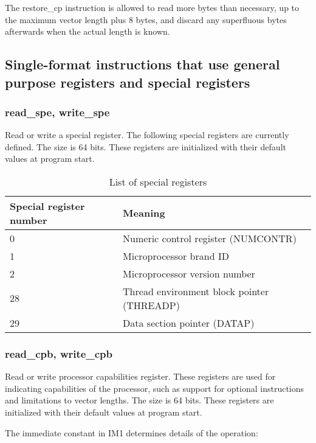 \documentclass[forwardcom.tex]{subfiles}
\begin{document}
The restore\_cp instruction is allowed to read more bytes than necessary, up to the maximum vector length plus 8 bytes, and discard any superfluous bytes afterwards when the actual length is known.

\subsection{Single-format instructions that use general purpose registers and special registers}

\subsubsection{read\_spe, write\_spe}
Read or write a special register. The following special registers are currently defined. The size is 64 bits. These registers are initialized with their default values at program start.

\begin{longtable} {|p{15mm}|p{100mm}|}
\caption{List of special registers} 
\label{table:specialRegisters} \\
\endfirsthead
\endhead
\hline
\bfseries Special register number & \bfseries Meaning  \\
\hline
0 & Numeric control register (NUMCONTR)  \\
1 & Microprocessor brand ID  \\
2 & Microprocessor version number   \\
28 & Thread environment block pointer (THREADP)   \\
29 & Data section pointer (DATAP)  \\
\hline
\end{longtable}


\subsubsection{read\_cpb, write\_cpb}
Read or write processor capabilities register. These registers are used for indicating capabilities of the processor, such as support for optional instructions and limitations to vector lengths. The size is 64 bits. These registers are initialized with their default values at program start.
\vspace{2mm}

The immediate constant in IM1 determines details of the operation:
\end{document}
